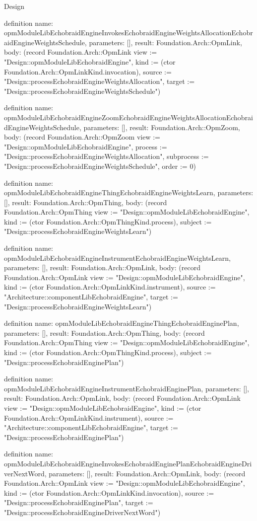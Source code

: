 \begin{lexlean}{Design}
\begin{semanticmodule}
definition{
  name: opmModuleLibEchobraidEngineInvokesEchobraidEngineWeightsAllocationEchobraidEngineWeightsSchedule,
  parameters: [],
  result: Foundation.Arch::OpmLink,
  body: (record Foundation.Arch::OpmLink {view := "Design::opmModuleLibEchobraidEngine", kind := (ctor Foundation.Arch::OpmLinkKind.invocation), source := "Design::processEchobraidEngineWeightsAllocation", target := "Design::processEchobraidEngineWeightsSchedule"})
}

definition{
  name: opmModuleLibEchobraidEngineZoomEchobraidEngineWeightsAllocationEchobraidEngineWeightsSchedule,
  parameters: [],
  result: Foundation.Arch::OpmZoom,
  body: (record Foundation.Arch::OpmZoom {view := "Design::opmModuleLibEchobraidEngine", process := "Design::processEchobraidEngineWeightsAllocation", subprocess := "Design::processEchobraidEngineWeightsSchedule", order := 0})
}

definition{
  name: opmModuleLibEchobraidEngineThingEchobraidEngineWeightsLearn,
  parameters: [],
  result: Foundation.Arch::OpmThing,
  body: (record Foundation.Arch::OpmThing {view := "Design::opmModuleLibEchobraidEngine", kind := (ctor Foundation.Arch::OpmThingKind.process), subject := "Design::processEchobraidEngineWeightsLearn"})
}

definition{
  name: opmModuleLibEchobraidEngineInstrumentEchobraidEngineWeightsLearn,
  parameters: [],
  result: Foundation.Arch::OpmLink,
  body: (record Foundation.Arch::OpmLink {view := "Design::opmModuleLibEchobraidEngine", kind := (ctor Foundation.Arch::OpmLinkKind.instrument), source := "Architecture::componentLibEchobraidEngine", target := "Design::processEchobraidEngineWeightsLearn"})
}

definition{
  name: opmModuleLibEchobraidEngineThingEchobraidEnginePlan,
  parameters: [],
  result: Foundation.Arch::OpmThing,
  body: (record Foundation.Arch::OpmThing {view := "Design::opmModuleLibEchobraidEngine", kind := (ctor Foundation.Arch::OpmThingKind.process), subject := "Design::processEchobraidEnginePlan"})
}

definition{
  name: opmModuleLibEchobraidEngineInstrumentEchobraidEnginePlan,
  parameters: [],
  result: Foundation.Arch::OpmLink,
  body: (record Foundation.Arch::OpmLink {view := "Design::opmModuleLibEchobraidEngine", kind := (ctor Foundation.Arch::OpmLinkKind.instrument), source := "Architecture::componentLibEchobraidEngine", target := "Design::processEchobraidEnginePlan"})
}

definition{
  name: opmModuleLibEchobraidEngineInvokesEchobraidEnginePlanEchobraidEngineDriverNextWord,
  parameters: [],
  result: Foundation.Arch::OpmLink,
  body: (record Foundation.Arch::OpmLink {view := "Design::opmModuleLibEchobraidEngine", kind := (ctor Foundation.Arch::OpmLinkKind.invocation), source := "Design::processEchobraidEnginePlan", target := "Design::processEchobraidEngineDriverNextWord"})
}


\end{semanticmodule}
\end{lexlean}
